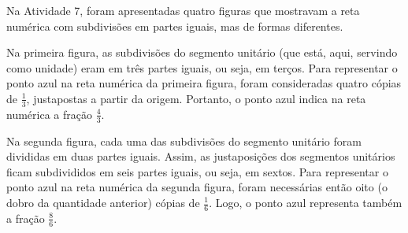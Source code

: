 \begin{refletindo*}

Na Atividade 7, foram apresentadas quatro figuras que mostravam a reta numérica com subdivisões em partes iguais, mas de formas diferentes.

Na primeira figura, as subdivisões do segmento unitário (que está, aqui, servindo como unidade) eram em três partes iguais, ou seja, em terços. Para representar o ponto azul na reta numérica da primeira figura, foram consideradas quatro cópias de $\frac{1}{3}$, justapostas a partir da origem. Portanto, o ponto azul indica na reta numérica a fração $\frac{4}{3}$.
\begin{center}
\end{center}

Na segunda figura, cada uma das subdivisões do segmento unitário foram divididas em duas partes iguais. Assim, as justaposições dos segmentos unitários ficam subdivididos em seis partes iguais, ou seja, em sextos. Para representar o ponto azul na reta numérica da segunda figura, foram necessárias então oito (o dobro da quantidade anterior) cópias de  $\frac{1}{6}$. Logo, o ponto azul representa também a fração $\frac{8}{6}$.

\begin{center}
\end{center}
\end{refletindo*}
